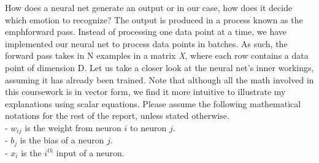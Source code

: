 How does a neural net generate an output or in our case, how does it decide which emotion to recognize?
The output is produced in a process known as the emph{forward pass}.
Instead of processing one data point at a time,
we have implemented our neural net to process data points in batches.
As such, the forward pass takes in N examples in a matrix \emph{X}, where each row contains a data point of dimension D.
Let us take a closer look at the neural net's inner workings, assuming it has already been trained.
Note that although all the math involved in this coursework is in vector form, we find it more intuitive to illustrate my explanations
using scalar equations.
Please assume the following mathematical notations for the rest of the report, unless stated otherwise.\\
\- - $w_{ij}$ is the weight from neuron $i$ to neuron $j$.\\
\- - $b_j$ is the bias of a neuron $j$.\\
\- - $x_i$ is the $i^{th}$ input of a neuron.
